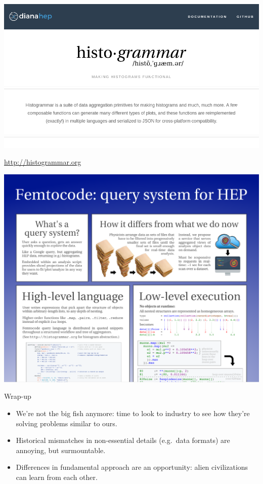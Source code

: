 \documentclass{beamer}
\begin{document}
\begin{frame}{}

{\mbox{\hspace{-1 cm}\includegraphics[width=1.2\linewidth]{frontpage.png}}}

\begin{center}
\textcolor{blue}{\underline{\url{http://histogrammar.org}}}
\end{center}
\end{frame}

\begin{frame}{}

{\mbox{\hspace{-1 cm}\includegraphics[width=1.2\linewidth]{femtocode.png}}}

\end{frame}

\begin{frame}{Wrap-up}
\vspace{0.5 cm}
\Large
\begin{itemize}\setlength{\itemsep}{0.5 cm}
\item We're not the big fish anymore: time to look to industry to see how they're solving problems similar to ours.
\item Historical mismatches in non-essential details (e.g.\ data formats) are annoying, but surmountable.
\item Differences in fundamental approach are an opportunity: alien civilizations can learn from each other.
\end{itemize}
\end{frame}
\end{document}
